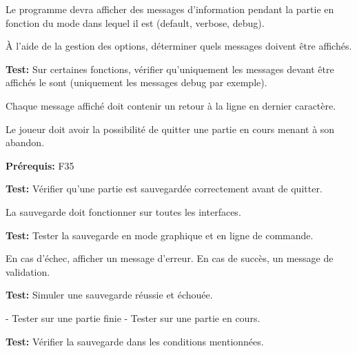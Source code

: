 \documentclass{article}
\begin{document}
\begin{needbox}
    Le programme devra afficher des messages d'information
    pendant la partie en fonction du mode dans lequel il est
    (default, verbose, debug).
    \begin{subneedbox}
        À l'aide de la gestion des options, déterminer quels messages doivent être affichés.

        \textbf{Test:} Sur certaines fonctions, vérifier qu'uniquement les messages devant
        être affichés le sont (uniquement les messages debug par exemple).
    \end{subneedbox}
    \begin{subneedbox}
        Chaque message affiché doit contenir un retour à la ligne en dernier caractère.
    \end{subneedbox}
\end{needbox}

\begin{needbox}
    \begin{subneedbox}
        Le joueur doit avoir la possibilité de quitter une partie en cours menant à son abandon.
    \end{subneedbox}

    \textbf{Prérequis:} F35

    \textbf{Test:} Vérifier qu'une partie est sauvegardée correctement avant de quitter.
\end{needbox}

\begin{needbox}
    \begin{subneedbox}
        La sauvegarde doit fonctionner sur toutes les interfaces.

        \textbf{Test:} Tester la sauvegarde en mode graphique et en ligne de commande.
    \end{subneedbox}
    
    \begin{subneedbox}
        En cas d’échec, afficher un message d’erreur. En cas de succès, un message de validation.

        \textbf{Test:} Simuler une sauvegarde réussie et échouée.
    \end{subneedbox}
    
    \begin{subneedbox}[F35.3: Tests]
        - Tester sur une partie finie
        - Tester sur une partie en cours.

        \textbf{Test:} Vérifier la sauvegarde dans les conditions mentionnées.
    \end{subneedbox}
\end{needbox}
\end{document}
